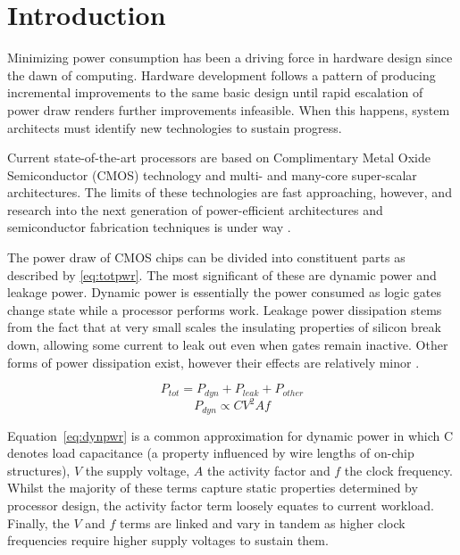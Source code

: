 \section{Introduction}

Minimizing power consumption has been a driving force in hardware design since the dawn of computing. Hardware development follows a pattern of producing incremental improvements to the same basic design until rapid escalation of power draw renders further improvements infeasible. When this happens, system architects must identify new technologies to sustain progress.

Current state-of-the-art processors are based on Complimentary Metal Oxide Semiconductor (CMOS) technology and multi- and many-core super-scalar architectures. The limits of these technologies are fast  approaching, however, and research into the next generation of power-efficient architectures and semiconductor fabrication techniques is under way \cite{esmaeilzadeh:2011aa}.

The power draw of CMOS chips can be divided into constituent parts as described by \autoref{eq:totpwr}. The most significant of these are dynamic power and leakage power. Dynamic power is essentially the power consumed as logic gates change state while a processor performs work. Leakage power dissipation stems from the fact that at very small scales the insulating properties of silicon break down, allowing some current to leak out even when gates remain inactive. Other forms of power dissipation exist, however their effects are relatively minor \cite{kaxiras:2008aa}.


\begin{equation}
\label{eq:totpwr}
P_{tot} = P_{dyn} + P_{leak} + P_{other}
\end{equation}
\begin{equation} 
\label{eq:dynpwr}
P_{dyn} \propto CV^{2}Af
\end{equation}

Equation~\ref{eq:dynpwr} is a common approximation for dynamic power in which C denotes load capacitance (a property influenced by wire lengths of on-chip structures), $V$ the supply voltage, $A$ the activity factor and $f$ the clock frequency. Whilst the majority of these terms capture static properties determined by processor design, the activity factor term loosely equates to current workload. Finally, the $V$ and $f$ terms are linked and vary in tandem as higher clock frequencies require higher supply voltages to sustain them. 


